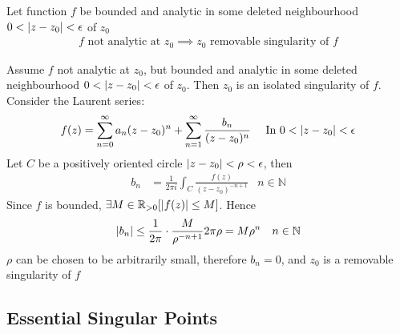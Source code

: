 \documentclass[12pt, english]{book}
\makeatletter
\renewenvironment{proof}[1][\proofname]{\par
	\pushQED{\qed}%
	\normalfont \topsep6\p@\@plus6\p@\relax
	\list{}{%
		\settowidth{\leftmargin}{\itshape\proofname:\hskip\labelsep}%
		\setlength{\labelwidth}{0pt}%
		\setlength{\itemindent}{-\leftmargin}%
		}%
	\item[\hskip\labelsep\itshape#1\@addpunct{:}]\ignorespaces
	}{\popQED\endlist\@endpefalse}
\makeatother
\begin{document}
	\begin{theorem}
		\label{Riemann's Theorem - Complex}
		Let function \(f\) be bounded and analytic in some deleted neighbourhood \(0 < \abs{z-z_0}<\epsilon\) of \(z_0\)
		\begin{align*}
			f \text{ not analytic at }z_0 \implies z_0 \text{ removable singularity of } f
		\end{align*}
	\end{theorem}
	\begin{proof}
		Assume \(f\) not analytic at \(z_0\), but bounded and analytic in some deleted neighbourhood \(0 < \abs{z-z_0}<\epsilon\) of \(z_0\). Then \(z_0\) is an isolated singularity of \(f\). Consider the Laurent series:
		\begin{align*}
			f(z) &= \sum_{n=0}^{\infty} a_n (z-z_0)^n + \sum_{n=1}^{\infty} \frac{b_n}{(z-z_0)^n}
			& \text{ In } 0<\abs{z-z_0}<\epsilon
		\end{align*}
		Let \(C\) be a positively oriented circle \(\abs{z-z_0}<\rho<\epsilon\), then
		\begin{align*}
			b_n &= \frac{1}{2\pi i} \int_{C} \frac{f(z)}{(z-z_0)^{-n+1}}
				& n \in \mathbb{N}
		\end{align*}
		Since \(f\) is bounded, \(\exists M \in \mathbb{R}_{>0} [ \abs{f(z)}\leq M]\). Hence
		\begin{align*}
			\abs{b_n} &\leq \frac{1}{2\pi} \cdot \frac{M}{\rho^{-n+1}} 2 \pi \rho = M\rho^n 
				& n \in \mathbb{N}
		\end{align*}
		\(\rho\) can be chosen to be arbitrarily small, therefore \(b_n = 0\), and \(z_0\) is a removable singularity of \(f\)
	\end{proof}

	
	\subsection{Essential Singular Points}
	
\end{document}

